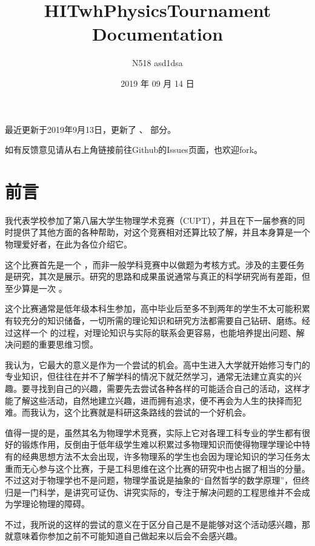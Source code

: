 \documentclass[a4paper,10pt,english]{sphinxmanual}
\title{HITwhPhysicsTournament Documentation}
\date{2019 年 09 月 14 日}
\author{N518 asd1dsa}
\begin{document}
\maketitle
\sphinxtableofcontents
{}\label{\detokenize{index::doc}}


最近更新于2019年9月13日，更新了  、  部分。

如有反馈意见请从右上角链接前往Github的Issues页面，也欢迎fork。


\chapter{前言}
\label{\detokenize{1. Preface:id1}}\label{\detokenize{1. Preface::doc}}
我代表学校参加了第八届大学生物理学术竞赛（CUPT），并且在下一届参赛的同时提供了其他方面的各种帮助，对这个竞赛相对还算比较了解，并且本身算是一个物理爱好者，在此为各位介绍它。

这个比赛首先是一个  ，而非一般学科竞赛中以做题为考核方式。涉及的主要任务是研究，其次是展示。研究的思路和成果虽说通常与真正的科学研究尚有差距，但至少算是一次  。

这个比赛通常是低年级本科生参加，高中毕业后至多不到两年的学生不太可能积累有较充分的知识储备，一切所需的理论知识和研究方法都需要自己钻研、磨练。经过这样一个  的过程，对理论知识与实际的联系会更容易，也能培养提出问题、解决问题的重要思维习惯。

我认为，它最大的意义是作为一个尝试的机会。高中生进入大学就开始修习专门的专业知识，但往往在并不了解学科的情况下就茫然学习，通常无法建立真实的兴趣。要寻找到自己的兴趣，需要先去尝试各种各样的可能适合自己的活动，这样才能了解这些活动，自然地建立兴趣，进而拥有追求，便不再会为人生的抉择而犯难。而我认为，这个比赛就是科研这条路线的尝试的一个好机会。

值得一提的是，虽然其名为物理学术竞赛，实际上它对各理工科专业的学生都有很好的锻炼作用，反倒由于低年级学生难以积累过多物理知识而使得物理学理论中特有的经典思想方法不太会出现，许多物理系的学生也会因为理论知识的学习任务太重而无心参与这个比赛，于是工科思维在这个比赛的研究中也占据了相当的分量。不过这对于物理学也不是问题，物理学虽说是抽象的“自然哲学的数学原理”，但终归是一门科学，是讲究可证伪、讲究实际的，专注于解决问题的工程思维并不会成为学理论物理的障碍。

不过，我所说的这样的尝试的意义在于区分自己是不是能够对这个活动感兴趣，那就意味着你参加之前不可能知道自己做起来以后会不会感兴趣。
\end{document}
